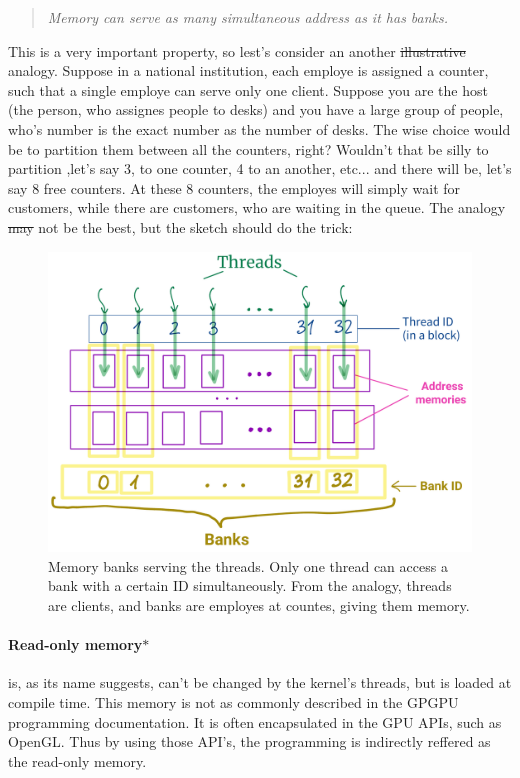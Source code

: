 \begin{quote}
   \textsl{Memory can serve as many simultaneous address as it has banks.} 
\end{quote}
This is a very important property, so lest's consider an another \sout{illustrative} analogy. Suppose in a national institution, 
each employe 
is assigned a counter, such that a single employe can serve only one client. Suppose you are the host 
(the person, who assignes people to desks)
and you have a large group of people, who's number is the exact number as the number of desks. The wise choice would be to 
partition them between all the counters, right? Wouldn't that be silly to partition ,let's say 3, to one counter, 4 to 
an another, etc... and there will be, let's say 8 free counters. At these 8 counters, the employes will simply wait 
for customers, while there are customers, who are waiting in the queue.
The analogy \sout{may} not be the best, but the sketch should do the trick: 

\begin{figure}[H]
   \centering
   \includegraphics[scale=0.18]{pngs/banks1.png}
   \caption{Memory banks serving the threads. Only one thread can access a bank with a certain ID simultaneously. 
   From the analogy, threads are clients, and banks are employes at countes, giving them memory.}
   \label{banks}

\end{figure}

\vspace{-0.5cm}
\paragraph{Read-only memory$\ast$} is, as its name suggests, can't be changed by the kernel's threads, but is loaded at compile time. This memory is not as commonly 
described in the GPGPU programming documentation. It is often 
encapsulated in the GPU APIs, such as OpenGL. Thus by using those API's, the programming is indirectly 
reffered as the read-only memory.

